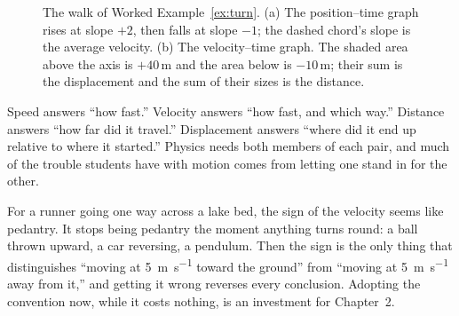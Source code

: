 \documentclass[11pt,twoside,openany]{book}
\begin{document}
\begin{figure}[htb]
\centering
{}
\caption{The walk of Worked Example~\ref{ex:turn}. (a) The position--time graph rises at slope $+2$, then falls at slope $-1$; the dashed chord's slope is the average velocity. (b) The velocity--time graph. The shaded area above the axis is $+40\,\si{\metre}$ and the area below is $-10\,\si{\metre}$; their sum is the displacement and the sum of their sizes is the distance.}
\label{fig:turn}
\end{figure}

\begin{keyidea}
Speed answers ``how fast.'' Velocity answers ``how fast, and which way.'' Distance answers ``how far did it travel.'' Displacement answers ``where did it end up relative to where it started.'' Physics needs both members of each pair, and much of the trouble students have with motion comes from letting one stand in for the other.
\end{keyidea}

\begin{modelnote}
For a runner going one way across a lake bed, the sign of the velocity seems like pedantry. It stops being pedantry the moment anything turns round: a ball thrown upward, a car reversing, a pendulum. Then the sign is the only thing that distinguishes ``moving at \SI{5}{\metre\per\second} toward the ground'' from ``moving at \SI{5}{\metre\per\second} away from it,'' and getting it wrong reverses every conclusion. Adopting the convention now, while it costs nothing, is an investment for Chapter~2.
\end{modelnote}
\end{document}
